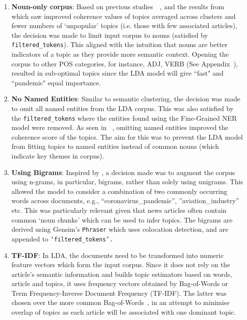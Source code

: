 \begin{enumerate}
  \item \textbf{Noun-only corpus}: Based on previous studies~\cite{nouns_only_lda}~\cite{efficient_noun_only_approach}, and the results from~ which saw improved coherence values of topics averaged across clusters and fewer numbers of `unpopular' topics (i.e. those with few associated articles), the decision was made to limit input corpus to nouns (satisfied by \texttt{filtered\_tokens}). This aligned with the intuition that nouns are better indicators of a topic as they provide more semantic context. Opening the corpus to other POS categories, for instance, ADJ, VERB (See Appendix~), resulted in sub-optimal topics since the LDA model will give ``fast" and ``pandemic" equal importance.
  
  \item \textbf{No Named Entities}: Similar to semantic clustering, the decision was made to omit all named entities from the LDA corpus. This was also satisfied by the \texttt{filtered\_tokens} where the entities found using the Fine-Grained NER model were removed. As seen in ~, omitting named entities improved the coherence score of the topics. The aim for this was to prevent the LDA model from fitting topics to named entities instead of common nouns (which indicate key themes in corpus). 

  \item \textbf{Using Bigrams}: Inspired by \cite[`Beyond bag of words']{bigrams_lda}, a decision made was to augment the corpus using n-grams, in particular, bigrams, rather than solely using unigrams. This allowed the model to consider a combination of two commonly occurring words across documents, e.g., ``coronavirus\_pandemic'', ''aviation\_industry'' etc. This was particularly relevant given that news articles often contain common `noun chunks' which can be used to infer topics. The bigrams are derived using Gensim's \texttt{Phraser} which uses colocation detection, and are appended to \texttt{‘filtered\_tokens’.}
  
  \item \textbf{TF-IDF}: In LDA, the documents need to be transformed into numeric feature vectors which form the input corpus. Since it does not rely on the article's semantic information and builds topic estimators based on words, article and topics, it uses frequency vectors obtained by Bag-of-Words or Term Frequency-Inverse Document Frequency (TF-IDF). The latter was chosen over the more common Bag-of-Words~\cite{topic_models}, in an attempt to minimise overlap of topics as each article will be associated with one dominant topic.
\end{enumerate}


